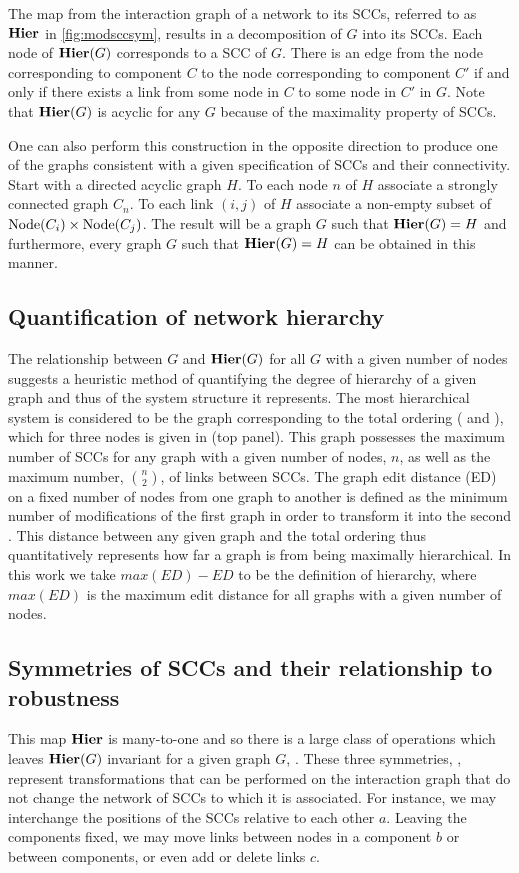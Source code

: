The map from the interaction graph of a network to its SCCs, referred to as $\mathbf{Hier}$ in \ref{fig:modsccsym}, results in a decomposition of $G$ into its SCCs. Each node of $\mathbf{Hier} (G)$ corresponds to a SCC of $G$. There is an edge from the node corresponding to component $C$ to the node corresponding to component $C'$ if and only if there exists a link from some node in $C$ to some node in $C'$ in $G$. Note that $\mathbf{Hier} (G)$ is acyclic for any $G$ because of the maximality property of SCCs.

One can also perform this construction in the opposite direction to produce one of the graphs consistent with a given specification of SCCs and their connectivity.  Start with a directed acyclic graph $H$.  To each node $n$ of $H$ associate
a strongly connected graph $C_n$.  To each link $(i,j)$ of $H$ associate a non-empty subset of $\mathrm{Node}(C_i) \times \mathrm{Node}(C_j)$.  The result will be a graph $G$ such that $\mathbf{Hier}(G) = H$ and furthermore, every graph $G$ such that $\mathbf{Hier}(G) = H$ can be obtained in this manner.

\subsection{Quantification of network hierarchy}

The relationship between $G$ and $\mathbf{Hier}(G)$ for all $G$ with a given number of nodes suggests a heuristic method of quantifying the degree of hierarchy of a given graph and thus of the system structure it represents. The most hierarchical system is considered to be the graph corresponding to the total ordering ( and \cite{Cormen2009}), which for three nodes is given in  (top panel). This graph possesses the maximum number of SCCs for any graph with a given number of nodes, $n$, as well as the maximum number, $\binom{n}{2}$, of links between SCCs. The graph edit distance (ED) on a fixed number of nodes from one graph to another is defined as the minimum number of modifications of the first graph in order to transform it into the second \cite{Axenovich2011}. This distance between any given graph and the total ordering thus quantitatively represents how far a graph is from being maximally hierarchical. In this work we take $max(ED) - ED$ to be the definition of hierarchy, where $max(ED)$ is the maximum edit distance for all graphs with a given number of nodes.

\subsection{Symmetries of SCCs and their relationship to robustness}
This map $\mathbf{Hier}$ is many-to-one and so there is a large class of
operations which leaves $\mathbf{Hier}(G)$ invariant for a given graph $G$, . These three symmetries, , represent transformations that can be performed on the interaction graph that do not change the network of SCCs to which it is associated.
For instance, we may interchange the positions of the SCCs relative to each other $a$.  Leaving the components fixed, we may move links between nodes in a component $b$ or between components, or even add or delete links $c$.

